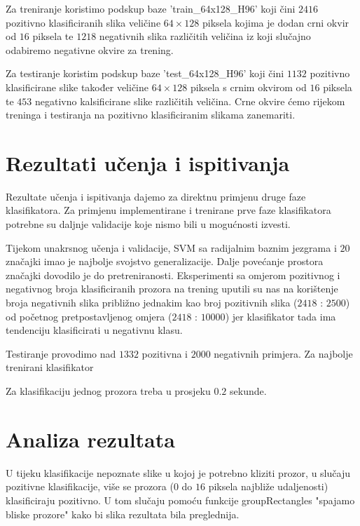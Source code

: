 \documentclass[seminar]{fer}
\begin{document}
Za treniranje koristimo podskup baze 'train\_64x128\_H96' koji čini $2416$ pozitivno klasificiranih slika veličine $64 \times 128$ piksela kojima je dodan crni okvir od $16$ piksela te $1218$ negativnih slika različitih veličina iz koji slučajno odabiremo negativne okvire za trening. 

Za testiranje koristim podskup baze 'test\_64x128\_H96' koji čini $1132$ pozitivno klasificirane slike također veličine $64 \times 128$ piksela s crnim okvirom od $16$ piksela te $453$ negativno kalsificirane slike različitih veličina. Crne okvire ćemo rijekom treninga i testiranja na pozitivno klasificiranim slikama zanemariti.


\section{Rezultati učenja i ispitivanja}

Rezultate učenja i ispitivanja dajemo za direktnu primjenu druge faze klasifikatora. Za primjenu implementirane i trenirane prve faze klasifikatora potrebne su daljnje validacije koje nismo bili u mogućnosti izvesti. 

Tijekom unakrsnog učenja i validacije, SVM sa radijalnim baznim jezgrama i $20$ značajki imao je najbolje svojstvo generalizacije. Dalje povećanje prostora značajki dovodilo je do pretreniranosti. Eksperimenti sa omjerom pozitivnog i negativnog broja klasificiranih prozora na trening uputili su nas na korištenje broja negativnih slika približno jednakim kao broj pozitivnih slika ($2418$ : $2500$) od početnog pretpostavljenog omjera ($2418$ : $10000$) jer klasifikator tada ima tendenciju klasificirati u negativnu klasu. 

Testiranje provodimo nad $1332$ pozitivna i $2000$ negativnih primjera. Za najbolje trenirani klasifikator  

Za klasifikaciju jednog prozora treba u prosjeku $0.2$ sekunde. 

\section{Analiza rezultata}

U tijeku klasifikacije nepoznate slike u kojoj je potrebno kliziti prozor, u slučaju  pozitivne klasifikacije, više se prozora ($0$ do $16$ piksela najbliže udaljenosti) klasificiraju pozitivno. U tom slučaju pomoću funkcije groupRectangles "spajamo bliske prozore" kako bi slika rezultata bila preglednija.
\end{document}
